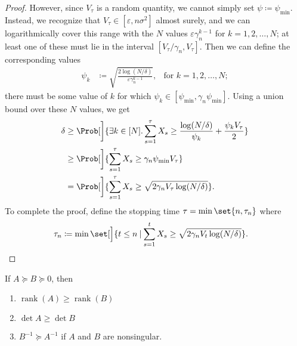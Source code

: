 \documentclass{article}
\newcommand{\defeq}{\coloneq}
\newcommand{\inv}[1]{#1^{-1}}
\DeclareMathOperator{\rank}{rank}
\newcommand\given[1][\delimsize]{%
  \providecommand{\delimsize}{}
  \nonscript\:#1\vert\allowbreak\nonscript\:\mathopen{}
}
\begin{document}
\begin{lemma}
\begin{proof}
    However, since $V_\tau$ is a random quantity, we cannot simply set
    $\psi \defeq \psi_{\min}$.  Instead, we recognize that
    $V_\tau \in [\varepsilon, n\sigma^2]$ almost surely, and we can
    logarithmically cover this range with the $N$ values
    $\varepsilon\gamma_n^{k-1}$ for $k=1,2,\dotsc,N$; at least one of
    these must lie in the interval $[V_\tau/\gamma_n, V_\tau]$.  Then
    we can define the corresponding values
    \begin{align*}
      \psi_k &\defeq \sqrt{\frac{2\log(N/\delta)}{\varepsilon\gamma_n^{k-1}}},
              &\text{for } k=1,2,\dotsc,N;
    \end{align*}
    there must be some value of $k$ for which
    $\psi_k \in [\psi_{\min}, \gamma_n\psi_{\min}]$.  Using a union bound
    over these $N$ values, we get
    \begin{align*}
      \delta
      &\ge \Prob[\bigg]{\exists k\in[N]. \sum_{s=1}^\tau X_s \ge \frac{\log(N/\delta)}{\psi_k} + \frac{\psi_k V_\tau}{2}} \\
      &\ge \Prob[\bigg]{\sum_{s=1}^\tau X_s \ge \gamma_n\psi_{\min}V_\tau} \\
      &= \Prob[\bigg]{\sum_{s=1}^\tau X_s \ge \sqrt{2\gamma_nV_\tau\log(N/\delta)}}.
    \end{align*}
    To complete the proof, define the stopping time $\tau =
    \min\set{n,\tau_n}$ where
    \begin{align*}
      \tau_n &\defeq \min\set[\Big]{t \le n \given \sum_{s=1}^tX_s \ge \sqrt{2\gamma_nV_t\log(N/\delta)}}.
              \qedhere
    \end{align*}
  \end{proof}
\end{lemma}


\begin{claim}
  If $A \succeq B \succeq 0$, then
  \begin{enumerate}
  \item $\rank(A) \ge \rank(B)$
  \item $\det A \ge \det B$
  \item $\inv{B} \succeq \inv{A}$ if $A$ and $B$ are nonsingular.
  \end{enumerate}
\end{claim}



\end{document}
